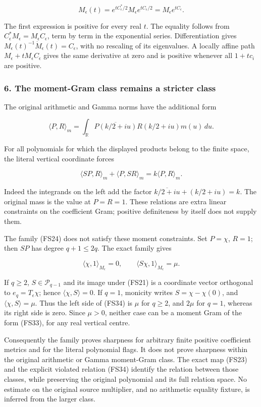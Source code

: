 \[
M_\epsilon(t)
=e^{tC_\epsilon^*/2}M_\epsilon e^{tC_\epsilon/2}
=M_\epsilon e^{tC_\epsilon}.
\tag{FS32}
\]

The first expression is positive for every real \(t\). The equality follows from \(C_\epsilon^*M_\epsilon=M_\epsilon C_\epsilon\), term by term in the exponential series. Differentiation gives \(M_\epsilon(t)^{-1}\dot M_\epsilon(t)=C_\epsilon\), with no rescaling of its eigenvalues. A locally affine path \(M_\epsilon+tM_\epsilon C_\epsilon\) gives the same derivative at zero and is positive whenever all \(1+tc_i\) are positive.

\subsubsection{6. The moment-Gram class remains a stricter class}\label{endpoint-four_window_sharpness--the-moment-gram-class-remains-a-stricter-class}

The original arithmetic and Gamma norms have the additional form

\[
\langle P,R\rangle_m
=\int_{\mathbb R}\overline{P(k/2+iu)}R(k/2+iu)m(u)\,du.
\tag{FS33}
\]

For all polynomials for which the displayed products belong to the finite space, the literal vertical coordinate forces

\[
\langle SP,R\rangle_m+\langle P,SR\rangle_m
=k\langle P,R\rangle_m.
\tag{FS34}
\]

Indeed the integrands on the left add the factor \(\overline{k/2+iu}+(k/2+iu)=k\). The original mass is the value at \(P=R=1\). These relations are extra linear constraints on the coefficient Gram; positive definiteness by itself does not supply them.

The family (FS24) does not satisfy these moment constraints. Set \(P=\chi\), \(R=1\); then \(SP\) has degree \(q+1\le2q\). The exact family gives

\[
\langle\chi,1\rangle_{M_\epsilon}=0,
\qquad
\langle S\chi,1\rangle_{M_\epsilon}=\mu.
\tag{FS35}
\]

If \(q\ge2\), \(S\in\mathcal P_{q-1}\) and its image under (FS21) is a coordinate vector orthogonal to \(e_q=T_\epsilon\chi\); hence \(\langle\chi,S\rangle=0\). If \(q=1\), monicity writes \(S=\chi-\chi(0)\), and \(\langle\chi,S\rangle=\mu\). Thus the left side of (FS34) is \(\mu\) for \(q\ge2\), and \(2\mu\) for \(q=1\), whereas its right side is zero. Since \(\mu>0\), neither case can be a moment Gram of the form (FS33), for any real vertical centre.

Consequently the family proves sharpness for arbitrary finite positive coefficient metrics and for the literal polynomial flags. It does not prove sharpness within the original arithmetic or Gamma moment-Gram class. The exact map (FS23) and the explicit violated relation (FS34) identify the relation between those classes, while preserving the original polynomial and its full relation space. No estimate on the original source multiplier, and no arithmetic equality fixture, is inferred from the larger class.

\endgroup


\endgroup

